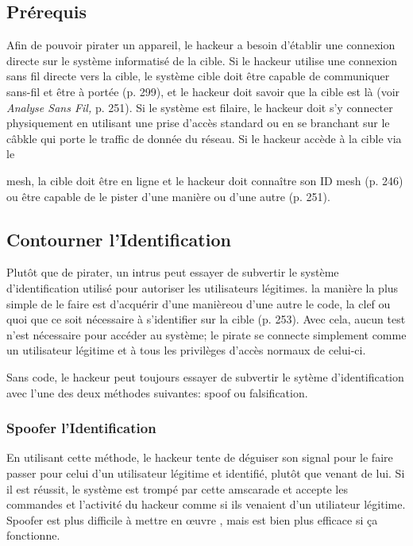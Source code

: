 \subsection{Prérequis} 

Afin de pouvoir pirater un appareil, le hackeur a besoin d'établir une connexion directe sur le système informatisé de la cible. Si le hackeur utilise une connexion sans fil directe vers la cible, le système cible doit être capable de communiquer sans-fil et être à portée (p. 299), et le hackeur doit savoir que la cible est là (voir \textit{Analyse Sans Fil,} p. 251). Si le système est filaire, le hackeur doit s'y connecter physiquement en utilisant une prise d'accès standard ou en se branchant sur le câbkle qui porte le traffic de donnée du réseau. Si le hackeur accède à la cible via le 

mesh, la cible doit être en ligne et le hackeur doit connaître son ID mesh (p. 246) ou être capable de le pister d'une manière ou d'une autre (p. 251). 

\subsection{Contourner l'Identification} 

Plutôt que de pirater, un intrus peut essayer de subvertir le système d'identification utilisé pour autoriser les utilisateurs légitimes. la manière la plus simple de le faire est d'acquérir d'une manièreou d'une autre le code, la clef ou quoi que ce soit nécessaire à s'identifier sur la cible (p. 253). Avec cela, aucun test n'est nécessaire pour accéder au système; le pirate se connecte simplement comme un utilisateur légitime et à tous les privilèges d'accès normaux de celui-ci. 

Sans code, le hackeur peut toujours essayer de subvertir le sytème d'identification avec l'une des deux méthodes suivantes: spoof ou falsification. 

\subsubsection{Spoofer l'Identification} 

En utilisant cette méthode, le hackeur tente de déguiser son signal pour le faire passer pour celui d'un utilisateur légitime et identifié, plutôt que venant de lui. Si il est réussit, le système est trompé par cette amscarade et accepte les commandes et l'activité du hackeur comme si ils venaient d'un utiliateur légitime. Spoofer est plus difficile à mettre en œuvre , mais est bien plus efficace si ça fonctionne. 

